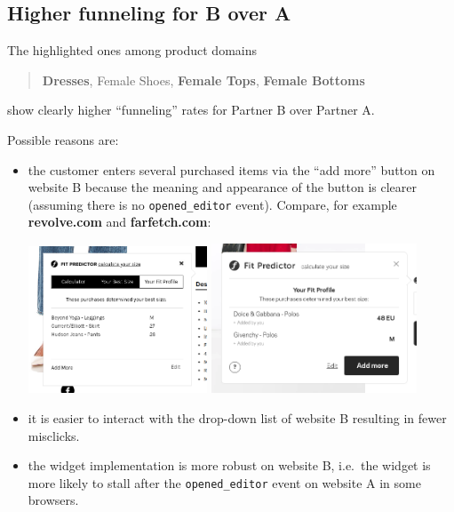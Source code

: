 \documentclass[12pt,a4paper]{article}
\begin{document}
    \subsection{Higher funneling for B over A}
    
    The highlighted ones
    among product domains
    \begin{quote}
        \textbf{Dresses},
        Female Shoes,
        \textbf{Female Tops},
        \textbf{Female Bottoms}
    \end{quote}
    show clearly higher ``funneling'' rates
    for Partner B over Partner A.
    
    
    Possible reasons are:
    \begin{itemize}
    \item 
        the customer enters several purchased items
        via the ``add more'' button
        on website B
        because the meaning and appearance of 
        the button is clearer
        (assuming there is no \verb|opened_editor| event).
        Compare, for example \textbf{revolve.com} and \textbf{farfetch.com}:
        \begin{center}
            \includegraphics[width=0.42\textwidth]{../img/more_button/revolve}
            \includegraphics[width=0.48\textwidth]{../img/more_button/farfetch}
        \end{center}
    \item
        it is easier to 
        interact with the drop-down list of website B
        resulting in fewer misclicks.
    \item
        the widget implementation 
        is more robust on website B,
        i.e.~the widget is more likely to stall
        after the \verb|opened_editor| event
        on website A
        in some browsers.
    \end{itemize}
\end{document}
